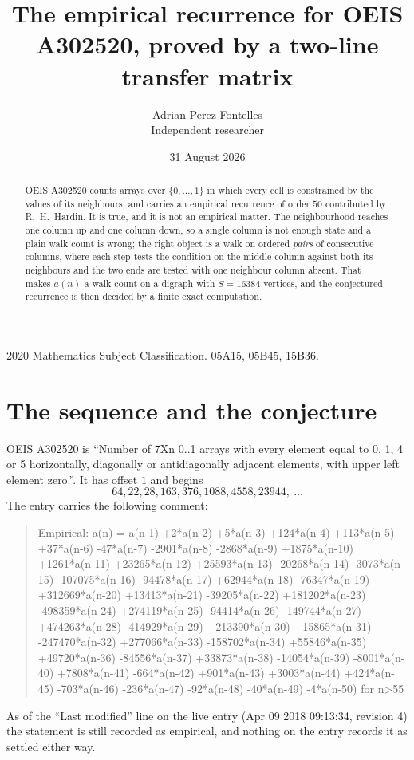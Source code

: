 \documentclass[11pt,a4paper]{article}
\title{The empirical recurrence for OEIS A302520, proved by a two-line transfer matrix}
\author{Adrian Perez Fontelles\\ \small Independent researcher}
\date{31 August 2026}
\theoremstyle{plain}
\theoremstyle{definition}
\begin{document}
\maketitle

\begin{abstract}
OEIS A302520 counts arrays over $\{0,\dots,1\}$ in which every cell is constrained by the
values of its neighbours, and carries an empirical recurrence of order $50$ contributed
by R.~H.~Hardin. It is true, and it is not an empirical matter. The neighbourhood reaches one
column up and one column down, so a single column is not enough state and a plain walk count
is wrong; the right object is a walk on ordered \emph{pairs} of consecutive columns, where
each step tests the condition on the middle column against both its neighbours and the two
ends are tested with one neighbour column absent. That makes $a(n)$ a walk count on a digraph
with $S=16384$ vertices, and the conjectured recurrence is then decided by a finite exact
computation.
\end{abstract}

\noindent\small 2020 Mathematics Subject Classification. 05A15, 05B45, 15B36.\normalsize

\section{The sequence and the conjecture}

OEIS A302520 is ``Number of 7Xn 0..1 arrays with every element equal to 0, 1, 4 or 5 horizontally, diagonally or antidiagonally adjacent elements, with upper left element zero.''. It has offset $1$ and begins
\[
64, 22, 28, 163, 376, 1088, 4558, 23944,\ \dots
\]
The entry carries the following comment:
\begin{quote}\small
Empirical: a(n) = a(n-1) +2*a(n-2) +5*a(n-3) +124*a(n-4) +113*a(n-5) +37*a(n-6) -47*a(n-7) -2901*a(n-8) -2868*a(n-9) +1875*a(n-10) +1261*a(n-11) +23265*a(n-12) +25593*a(n-13) -20268*a(n-14) -3073*a(n-15) -107075*a(n-16) -94478*a(n-17) +62944*a(n-18) -76347*a(n-19) +312669*a(n-20) +13413*a(n-21) -39205*a(n-22) +181202*a(n-23) -498359*a(n-24) +274119*a(n-25) -94414*a(n-26) -149744*a(n-27) +474263*a(n-28) -414929*a(n-29) +213390*a(n-30) +15865*a(n-31) -247470*a(n-32) +277066*a(n-33) -158702*a(n-34) +55846*a(n-35) +49720*a(n-36) -84556*a(n-37) +33873*a(n-38) -14054*a(n-39) -8001*a(n-40) +7808*a(n-41) -664*a(n-42) +901*a(n-43) +3003*a(n-44) +424*a(n-45) -703*a(n-46) -236*a(n-47) -92*a(n-48) -40*a(n-49) -4*a(n-50) for n>55
\end{quote}
As of the ``Last modified'' line on the live entry (Apr 09 2018 09:13:34, revision 4) the statement is
still recorded as empirical, and nothing on the entry records it as settled either way.
\end{document}
